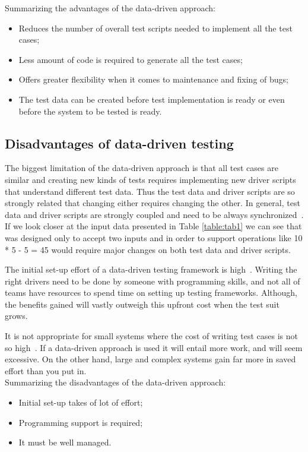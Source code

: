 \noindent Summarizing the advantages of the data-driven approach:

\begin{itemize}
\item Reduces the number of overall test scripts needed to
implement all the test cases;
\item Less amount of code is required to generate all the test cases;
\item Offers greater flexibility when it comes to maintenance and fixing of bugs;
\item The test data can be created before test implementation is ready or even
before the system to be tested is ready.
\end{itemize}

\subsection{Disadvantages of data-driven testing}

The biggest limitation of the data-driven approach is that all test cases are
similar and creating new kinds of tests requires implementing new driver scripts
that understand different test data. Thus the test data and driver scripts are
so strongly related that changing either requires changing the other. In general,
test data and driver scripts are strongly coupled and need to be always
synchronized~\cite{Fewster99}. If we look closer at the input data presented in
Table \ref{table:tab1} we can see that was designed only to accept two inputs
and in order to support operations like 10 * 5 - 5 = 45 would require major
changes on both test data and driver scripts.

The initial set-up effort of a data-driven testing framework is high~\cite{Fewster99}.
Writing the right drivers need to be done by someone with programming skills,
and not all of teams have resources to spend time on setting up testing
frameworks. Although, the benefits gained will vastly outweigh this upfront cost
when the test suit grows.

It is not appropriate for small systems where the cost of writing test cases is
not so high~\cite{Fewster99}. If a data-driven approach is used it will entail
more work, and will seem excessive. On the other hand, large and complex systems
gain far more in saved effort than you put in.\\[1mm]

\noindent Summarizing the disadvantages of the data-driven approach:
\begin{itemize}
\item Initial set-up takes of lot of effort;
\item Programming support is required;
\item It must be well managed.
\end{itemize}
